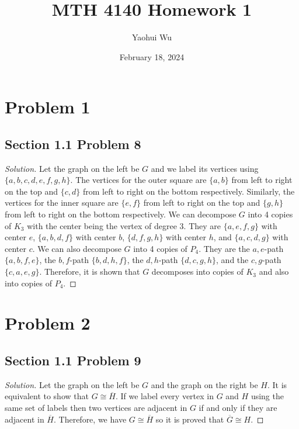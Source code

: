 \documentclass[12pt]{article}
\title{MTH 4140 Homework 1}
\author{Yaohui Wu}
\date{February 18, 2024}
\newenvironment{solution}{\begin{proof}[Solution]}{\end{proof}}
\begin{document}
\maketitle
\section*{Problem 1}
\subsection*{Section 1.1 Problem 8}
\begin{solution}
    Let the graph on the left be \(G\) and we label its vertices using
    \(\{a,b,c,d,e,f,g,h\}\). The vertices for the outer square are \(\{a,b\}\)
    from left to right on the top and \(\{c,d\}\) from left to right on the
    bottom respectively. Similarly, the vertices for the inner square are
    \(\{e,f\}\) from left to right on the top and \(\{g,h\}\) from left to right
    on the bottom respectively. We can decompose \(G\) into 4 copies of \(K_3\)
    with the center being the vertex of degree 3. They are \(\{a,e,f,g\}\) with
    center \(e\), \(\{a,b,d,f\}\) with center \(b\), \(\{d,f,g,h\}\) with center
    \(h\), and \(\{a,c,d,g\}\) with center \(c\). We can also decompose \(G\)
    into 4 copies of \(P_4\). They are the \(a,e\)-path \(\{a,b,f,e\}\), the
    \(b,f\)-path \(\{b,d,h,f\}\), the \(d,h\)-path \(\{d,c,g,h\}\), and the
    \(c,g\)-path \(\{c,a,e,g\}\). Therefore, it is shown that \(G\) decomposes
    into copies of \(K_3\) and also into copies of \(P_4\).
\end{solution}

\section*{Problem 2}
\subsection*{Section 1.1 Problem 9}
\begin{solution}
    Let the graph on the left be \(G\) and the graph on the right be \(H\). It
    is equivalent to show that \(G\cong\overline{H}\). If we label every vertex
    in \(G\) and \(H\) using the same set of labels then two vertices are
    adjacent in \(G\) if and only if they are adjacent in \(\overline{H}\).
    Therefore, we have \(G\cong\overline{H}\) so it is proved that \(\overline{G}\cong H\).
\end{solution}
\end{document}

